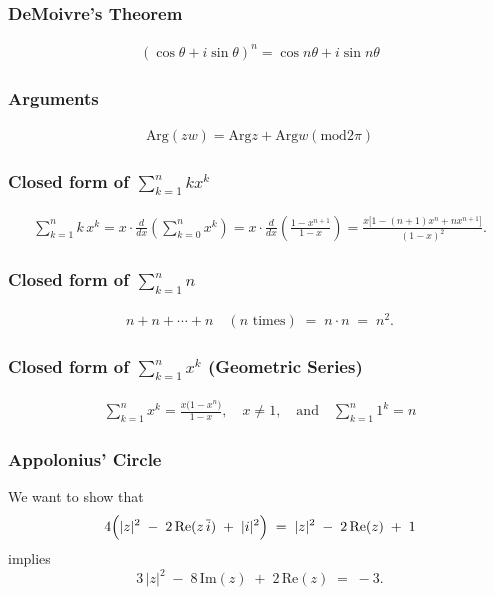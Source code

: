 \documentclass[9pt]{article}
\theoremstyle{definition} %
\theoremstyle{plain} %
\begin{document}
\subsubsection*{DeMoivre's Theorem}
\begin{align}
   \left( \cos\theta + i \sin \theta \right)^{n}=\cos n\theta + i \sin n\theta  
\end{align}
\subsubsection*{Arguments}
\begin{align}
    \text{Arg}(zw)= \text{Arg} z+ \text{Arg} w \left( \text{mod} 2\pi \right) 
\end{align}
\subsubsection*{Closed form of $\sum_{k=1}^{n} kx^{k}$}
\begin{align}
    \sum_{k=1}^n k\,x^k
= x \cdot \frac{d}{dx}\left(\sum_{k=0}^n x^k\right)
= x \cdot \frac{d}{dx}\left(\frac{1 - x^{n+1}}{1 - x}\right)
= \frac{x \bigl[1 - (n+1)x^n + n x^{n+1}\bigr]}{(1-x)^2}.
\end{align}
\subsubsection*{Closed form of $\sum_{k=1}^{n} n$ }
\begin{align}
    n + n + \cdots + n \quad (\text{\(n\) times}) \;=\; n \cdot n \;=\; n^2.
\end{align}
\subsubsection*{Closed form of $\sum_{k=1}^{n} x^{k}$ (Geometric Series)}
\begin{align}
\sum_{k=1}^{n} x^{k}
= \frac{x \bigl(1 - x^n\bigr)}{1 - x},
\quad x \neq 1,
\quad\text{and} \quad
\sum_{k=1}^{n} 1^k = n
\end{align}
\subsubsection*{Appolonius' Circle}
    We want to show that
\[
4\Bigl(\lvert z\rvert^{2} \;-\; 2\,\mathrm{Re}(z\,\overline{i}) \;+\; \lvert i\rvert^{2}\Bigr)
\;=\;
\lvert z\rvert^{2} \;-\; 2\,\mathrm{Re}(z) \;+\; 1
\]
implies
\[
3\,\lvert z\rvert^{2} \;-\;8\,\mathrm{Im}(z) \;+\;2\,\mathrm{Re}(z)
\;=\;
-3.
\]
\end{document}
